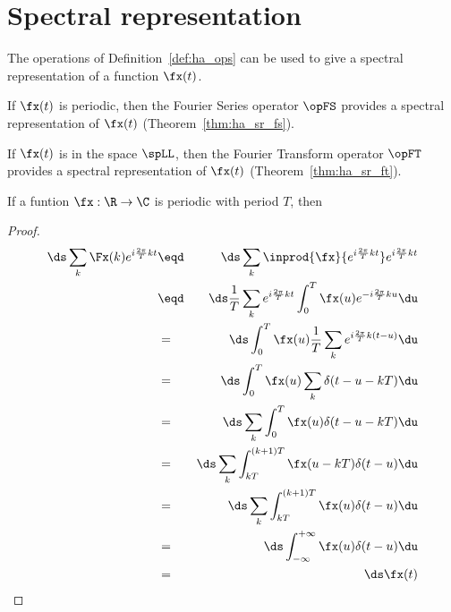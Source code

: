 \section{Spectral representation}
The operations of Definition~\ref{def:ha_ops} can be used to 
give a spectral representation of a function $\fx(t)$.
\begin{liste}
   \item If $\fx(t)$ is periodic, then the Fourier Series operator
         $\opFS$ provides a spectral representation of $\fx(t)$
         (Theorem~\ref{thm:ha_sr_fs}).
   \item If $\fx(t)$ is in the space $\spLL$, then the Fourier Transform operator
         $\opFT$ provides a spectral representation of $\fx(t)$
         (Theorem~\ref{thm:ha_sr_ft}).
\end{liste}
\begin{theorem}
\label{thm:ha_sr_fs}
If a funtion $\fx:\R\to\C$ is periodic with period $T$, then
\end{theorem}

\begin{proof}
\begin{eqnarray*}
     \ds \sum_k \Fx(k) e^{i\frac{2\pi}{T}kt}
       &\eqd& \ds \sum_k \inprod{\fx}{ e^{i\frac{2\pi}{T}kt} } e^{i\frac{2\pi}{T}kt}  
     \\&\eqd& \ds \frac{1}{T} \sum_k  e^{i\frac{2\pi}{T}kt} \int_0^T \fx(u) e^{-i\frac{2\pi}{T}ku} \du 
     \\&=&    \ds \int_0^T \fx(u) \frac{1}{T} \sum_k e^{i\frac{2\pi}{T}k(t-u)}  \du 
     \\&=&    \ds \int_0^T \fx(u) \sum_k \delta(t-u-kT)  \du 
     \\&=&    \ds \sum_k \int_0^T \fx(u) \delta(t-u-kT)  \du 
     \\&=&    \ds \sum_k \int_{kT}^{(k+1)T} \fx(u-kT) \delta(t-u)  \du 
     \\&=&    \ds \sum_k \int_{kT}^{(k+1)T} \fx(u) \delta(t-u)  \du 
     \\&=&    \ds \int_{-\infty}^{+\infty} \fx(u) \delta(t-u)  \du 
     \\&=&    \ds \fx(t) 
\end{eqnarray*}
\end{proof}



